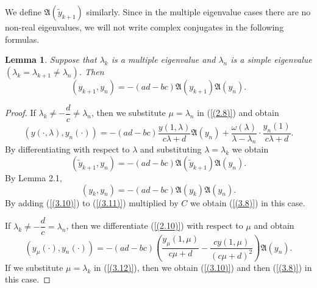 \documentclass[10pt,a4paper]{amsart}
\newtheorem{lem}[thm]{Lemma}
\numberwithin{equation}{section}
\begin{document}
We define $\mathfrak{A}(\tilde{y}_{k+1})$ similarly. Since in the multiple eigenvalue cases there are no non-real eigenvalues, we will not write complex conjugates in the following formulas.
\begin{lem} Suppose that \(\lambda_{k}\) is a multiple  eigenvalue and \(\lambda_{n}\) is a simple  eigenvalue \((\lambda_{k}=\lambda_{k+1}\ne\lambda_{n})\). Then 
\begin{equation}
\left( y_{k + 1},y_{n} \right) = - (ad - bc)\mathfrak{A}(y_{k+1})\mathfrak{A}(y_{n}). \label{(3.8)}
\end{equation}
\end{lem}

\begin{proof}
If $\lambda_k \neq -\dfrac{d}{c}\neq\lambda_n$, then we substitute $\mu=\lambda_n$ in (\ref{(2.8)}) and obtain 
\begin{equation}
\left(y(\cdot,\lambda), y_n(\cdot)\right)
= -(ad - bc)\frac{y(1,\lambda)}{c\lambda + d}\mathfrak{A}(y_{n})+ \frac{\omega(\lambda)}{\lambda - \lambda_n} \cdot \frac{y_n(1)}{c\lambda + d}.\label{(3.9)}
\end{equation}
By differentiating with respect to $\lambda$ and substituting $\lambda=\lambda_k$ we obtain 
\begin{equation}
\left( \tilde{y}_{k + 1},y_{n} \right) = - (ad - bc)\mathfrak{A}(\tilde{y}_{k+1})\mathfrak{A}(y_{n}). \label{(3.10)}
\end{equation}
By Lemma 2.1,
\begin{equation}
\left({y}_{k},y_{n} \right) = - (ad - bc)\mathfrak{A}({y}_{k})\mathfrak{A}(y_{n}). \label{(3.11)}
\end{equation}
By adding (\ref{(3.10)}) to  (\ref{(3.11)}) multiplied by $C$ we obtain (\ref{(3.8)}) in this case.

If $\lambda_k \neq -\dfrac{d}{c}=\lambda_n$, then we differentiate (\ref{(2.10)}) with respect to $\mu$ and obtain
\begin{equation}
\left(y_\mu(\cdot), y_n(\cdot)\right)
= -(ad - bc)\left(\frac{{y_\mu(1,\mu)}}{c\mu + d}-\frac{{cy(1,\mu)}}{(c\mu + d)^2}\right)\mathfrak{A}({y}_{n}). \label{(3.12)}
\end{equation}
If we substitute $\mu=\lambda_k$ in (\ref{(3.12)}), then we obtain (\ref{(3.10)}) and then (\ref{(3.8)}) in this case.


\end{proof}
\end{document}
